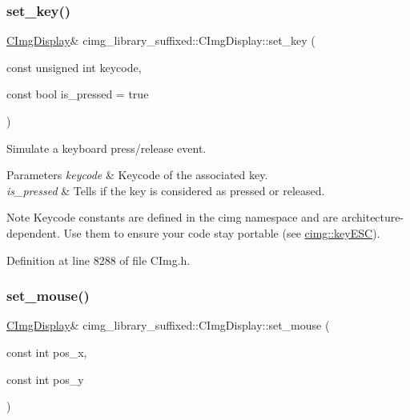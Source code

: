 \subsubsection{\texorpdfstring{set\+\_\+key()}{set\_key()}\hspace{0.1cm}{\footnotesize\ttfamily [2/2]}}
{\footnotesize\ttfamily \hyperlink{structcimg__library__suffixed_1_1CImgDisplay}{C\+Img\+Display}\& cimg\+\_\+library\+\_\+suffixed\+::\+C\+Img\+Display\+::set\+\_\+key (\begin{DoxyParamCaption}\item[{const unsigned int}]{keycode,  }\item[{const bool}]{is\+\_\+pressed = {\ttfamily true} }\end{DoxyParamCaption})\hspace{0.3cm}{\ttfamily [inline]}}



Simulate a keyboard press/release event. 


\begin{DoxyParams}{Parameters}
{\em keycode} & Keycode of the associated key. \\
\hline
{\em is\+\_\+pressed} & Tells if the key is considered as pressed or released. \\
\hline
\end{DoxyParams}
\begin{DoxyNote}{Note}
Keycode constants are defined in the cimg namespace and are architecture-\/dependent. Use them to ensure your code stay portable (see \hyperlink{namespacecimg__library__suffixed_1_1cimg_abaabb7beac6bae90502bd8378f7037f9}{cimg\+::key\+E\+SC}). 
\end{DoxyNote}


Definition at line 8288 of file C\+Img.\+h.

\mbox{\label{structcimg__library__suffixed_1_1CImgDisplay_a3506d159167c9378c34e20c09228acf1}} 
\subsubsection{\texorpdfstring{set\+\_\+mouse()}{set\_mouse()}}
{\footnotesize\ttfamily \hyperlink{structcimg__library__suffixed_1_1CImgDisplay}{C\+Img\+Display}\& cimg\+\_\+library\+\_\+suffixed\+::\+C\+Img\+Display\+::set\+\_\+mouse (\begin{DoxyParamCaption}\item[{const int}]{pos\+\_\+x,  }\item[{const int}]{pos\+\_\+y }\end{DoxyParamCaption})\hspace{0.3cm}{\ttfamily [inline]}}



